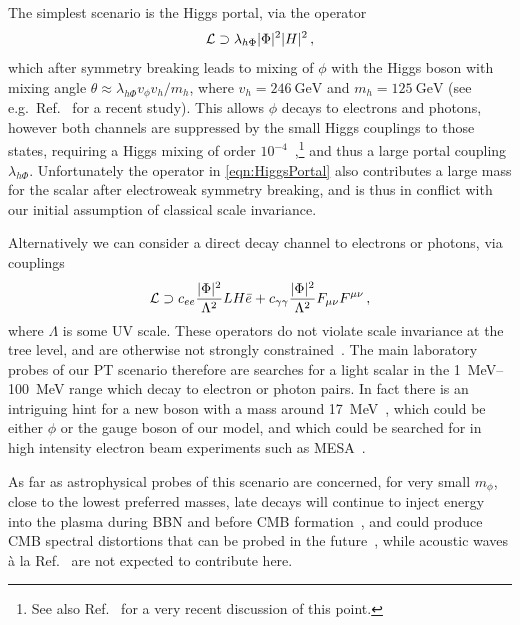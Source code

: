 \documentclass{article}
\begin{document}
The simplest scenario is the Higgs portal, via the operator
\begin{equation}
    {\cal L} \supset \lambda_{h \Phi} |\Phi|^2 |H|^2\,, \label{eqn:HiggsPortal}
\end{equation}
%
which after symmetry breaking leads to mixing of $\phi$ with the Higgs boson with mixing angle $\theta \approx \lambda_{h \Phi} v_\phi v_{h}/m_h$, where $v_h = \SI{246}{\GeV}$ and $m_h=\SI{125}{\GeV}$ (see e.g.\ Ref.~\cite{Ferber:2023iso} for a recent study). This allows $\phi$ decays to electrons and photons, however both channels are suppressed by the small Higgs couplings to those states, requiring a Higgs mixing of order $10^{-4}$~\cite{Ibe:2021fed,Agrawal:2021dbo},\footnote{See also Ref.~\cite{Bringmann:2023opz} for a very recent discussion of this point.} and thus a large portal coupling $\lambda_{h \Phi}$. Unfortunately the operator in \cref{eqn:HiggsPortal} also contributes a large mass for the scalar after electroweak symmetry breaking, and is thus in conflict with our initial assumption of classical scale invariance. 

Alternatively we can consider a direct decay channel to electrons or photons, via couplings
%
\begin{equation}
    {\cal L} \supset c_{ee}\frac{|\Phi|^2}{\Lambda^2} L H \bar{e} + c_{\gamma \gamma} \frac{|\Phi|^2}{\Lambda^2} F_{\mu\nu}F^{\mu\nu}\,,
\end{equation}
%
where $\Lambda$ is some UV scale. 
These operators do not violate scale invariance at the tree level, and are otherwise not strongly constrained~\cite{NA64:2021xzo}. The main laboratory probes of our PT scenario therefore are searches for a light scalar in the \SIrange{1}{100}{\MeV} range which decay to electron or photon pairs. 
In fact there is an intriguing hint for a new boson with a mass around \SI{17}{\MeV}~\cite{Krasznahorkay:2015iga,Feng:2016ysn}, which could be either $\phi$ or the gauge boson of our model, and
which could be searched for in high intensity electron beam experiments such as MESA~\cite{Backens:2021qkv}. 

As far as astrophysical probes of this scenario are concerned, for very small $m_\phi$, close to the lowest preferred masses, late decays will continue to inject energy into the plasma during BBN and before CMB formation~\cite{Coffey:2020oir,Depta:2020zbh}, and could produce CMB spectral distortions that can be probed in the future~\cite{Chluba:2019nxa}, while acoustic waves \`a la Ref.~\cite{Ramberg:2022irf} are not expected to contribute here. 
\end{document}
